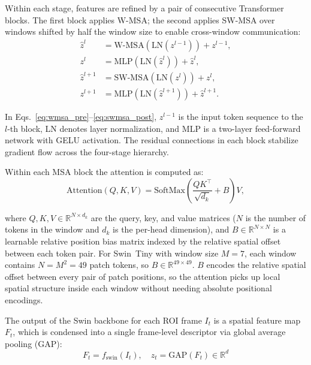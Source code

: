 \documentclass[conference]{IEEEtran}
\begin{document}
Within each stage, features are refined by a pair of consecutive Transformer blocks. The first block applies W-MSA; the second applies SW-MSA over windows shifted by half the window size to enable cross-window communication:
\begin{align}
\hat{z}^{l}   &= \text{W-MSA}\!\left(\text{LN}(z^{l-1})\right) + z^{l-1}, \label{eq:wmsa_pre} \\
z^{l}         &= \text{MLP}\!\left(\text{LN}(\hat{z}^{l})\right) + \hat{z}^{l}, \label{eq:wmsa_post} \\
\hat{z}^{l+1} &= \text{SW-MSA}\!\left(\text{LN}(z^{l})\right) + z^{l}, \label{eq:swmsa_pre} \\
z^{l+1}       &= \text{MLP}\!\left(\text{LN}(\hat{z}^{l+1})\right) + \hat{z}^{l+1}. \label{eq:swmsa_post}
\end{align}

\noindent In Eqs.~\ref{eq:wmsa_pre}--\ref{eq:swmsa_post}, $z^{l-1}$ is the input token sequence to the $l$-th block, LN denotes layer normalization, and MLP is a two-layer feed-forward network with GELU activation. The residual connections in each block stabilize gradient flow across the four-stage hierarchy.

Within each MSA block the attention is computed as:
\begin{equation}
\text{Attention}(Q, K, V) = \text{SoftMax}\!\left(\frac{QK^{\top}}{\sqrt{d_k}} + B\right)V,
\label{eq:swin_attention}
\end{equation}

\noindent where $Q, K, V \in \mathbb{R}^{N \times d_k}$ are the query, key, and value matrices ($N$ is the number of tokens in the window and $d_k$ is the per-head dimension), and $B \in \mathbb{R}^{N \times N}$ is a learnable relative position bias matrix indexed by the relative spatial offset between each token pair. For Swin~Tiny with window size $M = 7$, each window contains $N = M^2 = 49$ patch tokens, so $B \in \mathbb{R}^{49 \times 49}$. $B$ encodes the relative spatial offset between every pair of patch positions, so the attention picks up local spatial structure inside each window without needing absolute positional encodings.

The output of the Swin backbone for each ROI frame $I_t$ is a spatial feature map $F_t$, which is condensed into a single frame-level descriptor via global average pooling (GAP):
\begin{equation}
F_t = f_{\text{swin}}(I_t), \quad z_t = \text{GAP}(F_t) \in \mathbb{R}^d
\label{eq:swin_gap}
\end{equation}
\end{document}
